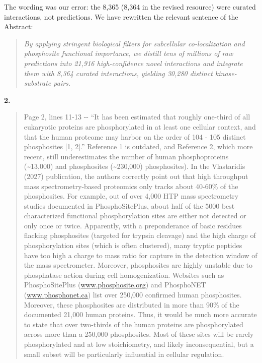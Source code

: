 \documentclass[
]{article}
\begin{document}
The wording was our error: the 8,365 (8,364 in the revised resource)
were curated interactions, not predictions. We have rewritten the
relevant sentence of the Abstract:

\begin{quote}
\emph{By applying stringent biological filters for subcellular
co-localization and phosphosite functional importance, we distill tens
of millions of raw predictions into 21,916 high-confidence novel
interactions and integrate them with 8,364 curated interactions,
yielding 30,280 distinct kinase-substrate pairs.}
\end{quote}

\textbf{2.}

\begin{quote}
Page 2, lines 11-13 -\/- ``It has been estimated that roughly one-third
of all eukaryotic proteins are phosphorylated in at least one cellular
context, and that the human proteome may harbor on the order of 104 -
105 distinct phosphosites {[}1, 2{]}.'' Reference 1 is outdated, and
Reference 2, which more recent, still underestimates the number of human
phosphoproteins (\textasciitilde13,000) and phosphosites
(\textasciitilde230,000) phosphosites). In the Vlastaridis (2027)
publication, the authors correctly point out that high throughput mass
spectrometry-based proteomics only tracks about 40-60\% of the
phosphosites. For example, out of over 4,000 HTP mass spectrometry
studies documented in PhosphoSitePlus, about half of the 5000 best
characterized functional phosphorylation sites are either not detected
or only once or twice. Apparently, with a preponderance of basic
residues flacking phosphosites (targeted for trypsin cleavage) and the
high charge of phosphorylation sites (which is often clustered), many
tryptic peptides have too high a charge to mass ratio for capture in the
detection window of the mass spectrometer. Moreover, phosphosites are
highly unstable due to phosphatase action during cell homogenization.
Websites such as PhosphoSitePlus
(\href{http://www.phosphosite.org}{www.phosphosite.org}) and PhosphoNET
(\href{http://www.phosphonet.ca}{www.phosphonet.ca}) list over 250,000
confirmed human phosphosites. Moreover, these phosphosites are
distributed in more than 90\% of the documented 21,000 human proteins.
Thus, it would be much more accurate to state that over two-thirds of
the human proteins are phosphorylated across more than a 250,000
phosphosites. Most of these sites will be rarely phosphorylated and at
low stoichiometry, and likely inconsequential, but a small subset will
be particularly influential in cellular regulation.
\end{quote}
\end{document}
